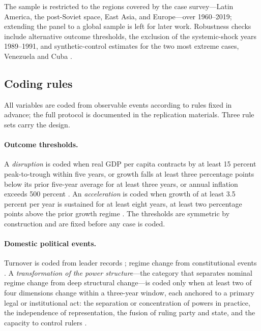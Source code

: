 \documentclass[11pt]{article}
\begin{document}
The sample is restricted to the regions covered by the case survey---Latin America, the post-Soviet space, East Asia, and Europe---over 1960--2019; extending the panel to a global sample is left for later work. Robustness checks include alternative outcome thresholds, the exclusion of the systemic-shock years 1989--1991, and synthetic-control estimates for the two most extreme cases, Venezuela and Cuba \parencite{abadie_diamond_hainmueller_2010}.

\subsection{Coding rules}
\label{sec:coding}

All variables are coded from observable events according to rules fixed in advance; the full protocol is documented in the replication materials. Three rule sets carry the design.

\paragraph{Outcome thresholds.} A \emph{disruption} is coded when real GDP per capita contracts by at least 15 percent peak-to-trough within five years, or growth falls at least three percentage points below its prior five-year average for at least three years, or annual inflation exceeds 500 percent \parencite{rodrik_1999}. An \emph{acceleration} is coded when growth of at least 3.5 percent per year is sustained for at least eight years, at least two percentage points above the prior growth regime \parencite{hausmann_pritchett_rodrik_2005}. The thresholds are symmetric by construction and are fixed before any case is coded.

\paragraph{Domestic political events.} Turnover is coded from leader records \parencite{goemans_gleditsch_chiozza_2009}; regime change from constitutional events \parencite{elkins_ginsburg_melton_2009}. A \emph{transformation of the power structure}---the category that separates nominal regime change from deep structural change---is coded only when at least two of four dimensions change within a three-year window, each anchored to a primary legal or institutional act: the separation or concentration of powers in practice, the independence of representation, the fusion of ruling party and state, and the capacity to control rulers \parencite{garciatrevijano2010}.
\end{document}
